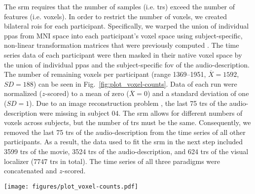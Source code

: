 
The \ac{srm} requires that the number of samples (i.e. \acp{tr}) exceed the
number of features (i.e. voxels).
%
In order to restrict the number of voxels, we created bilateral \acp{roi} for
each participant.
%
Specifically, we warped the union of individual \acp{ppa} \citep[s. Fig. 1
in][]{haeusler2022processing} from MNI space into each participant's voxel space
using subject-specific, non-linear transformation matrices that were previously
computed
\citep[][\href{https://github.com/psychoinformatics-de/studyforrest-data-templatetransforms
}{\url{github.com/psychoinformatics-de/studyforrest-data-templatetransforms}}]{hanke2014audiomovie}.
The time series data of each participant were then masked in their native voxel
space by the union of individual \acp{ppa} and the subject-specific \ac{fov} of
the audio-description.
The number of remaining voxels per participant (range 1369--1951,
$\overline{X}=1592$, $SD=188$) can be seen in Fig.~\ref{fig:plot_voxel-counts}.
Data of each run were normalized ($z$-scored) to a mean of zero
($\overline{X}=0$) and a standard deviation of one ($SD=1$).
%
Due to an image reconstruction problem \citep[cf.][]{hanke2014audiomovie}, the
last 75 \acp{tr} of the audio-description were missing in subject 04.
%
The \ac{srm} allows for different numbers of voxels across subjects, but the
number of \acp{tr} must be the same.
%
Consequently, we removed the last 75 \acp{tr} of the audio-description from the
time series of all other participants.
As a result, the data used to fit the \ac{srm} in the next step included 3599
\acp{tr} of the movie, 3524 \acp{tr} of the audio-description, and 624 \acp{tr}
of the visual localizer (7747 \acp{tr} in total).
The time series of all three paradigms were concatenated and $z$-scored.

\begin{figure*}[tbp]
\centering
\texttt{[image: figures/plot\_voxel-counts.pdf]}
\caption{
%
    \textbf{Size of the regions of interest (ROIs) of each participant.}
%
In order to reduce the number of voxels, we warped the union of
individual \acp{ppa} \citep[cf. Fig. 1 in][]{haeusler2022processing} from
MNI152 space into each participant's native voxel space.
%
The remaining voxels of each participant were further constrained to those
voxels that are included in the respective participant's \ac{fov} of the
audio-description \citep[cf.][]{hanke2014audiomovie}.
}
\label{fig:plot_voxel-counts}
\end{figure*}


